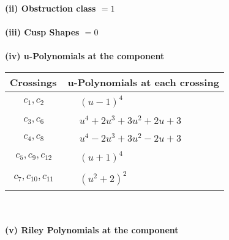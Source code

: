 \documentclass[1p]{elsarticle_modified}
\theoremstyle{definition}
\begin{document}
\flushleft \textbf{(ii) Obstruction class $= 1$}\\~\\
\flushleft \textbf{(iii) Cusp Shapes $= 0$}\\~\\
\newpage\renewcommand{\arraystretch}{1}
\flushleft \textbf{(iv) u-Polynomials at the component}\newline \\
\begin{tabular}{m{50pt}|m{274pt}}
Crossings & \hspace{64pt}u-Polynomials at each crossing \\
\hline $$\begin{aligned}c_{1},c_{2}\end{aligned}$$&$\begin{aligned}
&(u-1)^4
\end{aligned}$\\
\hline $$\begin{aligned}c_{3},c_{6}\end{aligned}$$&$\begin{aligned}
&u^4+2 u^3+3 u^2+2 u+3
\end{aligned}$\\
\hline $$\begin{aligned}c_{4},c_{8}\end{aligned}$$&$\begin{aligned}
&u^4-2 u^3+3 u^2-2 u+3
\end{aligned}$\\
\hline $$\begin{aligned}c_{5},c_{9},c_{12}\end{aligned}$$&$\begin{aligned}
&(u+1)^4
\end{aligned}$\\
\hline $$\begin{aligned}c_{7},c_{10},c_{11}\end{aligned}$$&$\begin{aligned}
&(u^2+2)^2
\end{aligned}$\\
\hline
\end{tabular}\\~\\
\newpage\renewcommand{\arraystretch}{1}
\flushleft \textbf{(v) Riley Polynomials at the component}\newline \\
\end{document}
